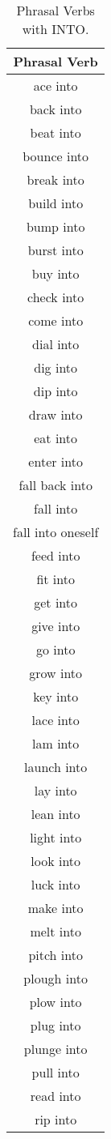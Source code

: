 
\begin{longtable}{c}
\caption{Phrasal Verbs with INTO.} \label{a:into} \\
\midrule
\toprule 
\textbf{Phrasal Verb} \\
\midrule
ace into \\
back into \\
beat into \\
bounce into \\
break into \\
build into \\
bump into \\
burst into \\
buy into \\
check into \\
come into \\
dial into \\
dig into \\
dip into \\
draw into \\
eat into \\
enter into \\
fall back into \\
fall into \\
fall into oneself \\
feed into \\
fit into \\
get into \\
give into \\
go into \\
grow into \\
key into \\
lace into \\
lam into \\
launch into \\
lay into \\
lean into \\
light into \\
look into \\
luck into \\
make into \\
melt into \\
pitch into \\
plough into \\
plow into \\
plug into \\
plunge into \\
pull into \\
read into \\
rip into \\

\end{longtable}
